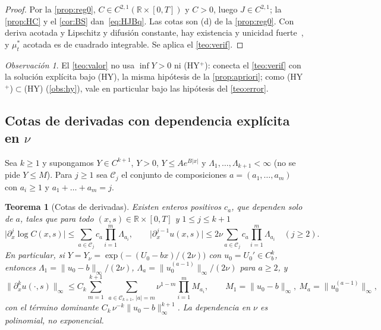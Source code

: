\documentclass[11pt,letterpaper]{article}
\theoremstyle{plain}
\newtheorem{teorema}[theorem]{Teorema}
\theoremstyle{definition}
\theoremstyle{remark}
\newtheorem{observacion}[theorem]{Observación}
\numberwithin{equation}{section}
\newcommand{\R}{\mathbb{R}}
\begin{document}
	\begin{proof}
		Por la \cref{prop:reg0}, \(C\in C^{2,1}(\R\times[0,T])\) y \(C>0\), luego \(J\in C^{2,1}\); la \cref{prop:HC} y el \cref{cor:BS} dan~\eqref{eq:HJBq}. Las cotas son (d) de la \cref{prop:reg0}. Con deriva acotada y Lipschitz y difusión constante, hay existencia y unicidad fuerte~\cite[Teor.~5.2.1]{Oksendal2003}, y \(\mu^\ast_t\) acotada es de cuadrado integrable. Se aplica el \cref{teo:verif}.
	\end{proof}
	
	\begin{observacion}
		El \cref{teo:valor} no usa \(\inf Y>0\) ni (HY\(^+\)): conecta el \cref{teo:verif} con la solución explícita bajo (HY), la misma hipótesis de la \cref{prop:apriori}; como (HY\(^+\))\(\subset\)(HY) (\cref{obs:hy}), vale en particular bajo las hipótesis del \cref{teo:error}.
	\end{observacion}
	
	\subsection{Cotas de derivadas con dependencia explícita en \texorpdfstring{\(\nu\)}{ν}}\label{subsec:cotasnu}
	
	Sea \(k\ge1\) y supongamos \(Y\in C^{k+1}\), \(Y>0\), \(Y\le Ae^{B|x|}\) y \(\Lambda_1,\dots,\Lambda_{k+1}<\infty\) (no se pide \(Y\le M\)). Para \(j\ge1\) sea \(\mathcal C_{j}\) el conjunto de composiciones \(a=(a_1,\dots,a_m)\) con \(a_i\ge1\) y \(a_1+\dots+a_m=j\).
	
	\begin{teorema}[Cotas de derivadas]\label{teo:cotasnu}
		Existen enteros positivos \(c_a\), que dependen solo de \(a\), tales que para todo \((x,s)\in\R\times[0,T]\) y \(1\le j\le k+1\)
		\[
		\bigl|\partial_x^j\log C(x,s)\bigr|\le\sum_{a\in\mathcal C_j}c_a\prod_{i=1}^{m}\Lambda_{a_i},
		\qquad
		\bigl|\partial_x^{j-1}u(x,s)\bigr|\le 2\nu\sum_{a\in\mathcal C_j}c_a\prod_{i=1}^{m}\Lambda_{a_i}\quad(j\ge2).
		\]
		En particular, si \(Y=Y_\nu=\exp\bigl(-(U_0-bx)/(2\nu)\bigr)\) con \(u_0=U_0'\in C_b^{k}\), entonces \(\Lambda_1=\|u_0-b\|_\infty/(2\nu)\), \(\Lambda_a=\|u_0^{(a-1)}\|_\infty/(2\nu)\) para \(a\ge2\), y
		\begin{equation}\label{eq:cotasnu}
			\|\partial_x^ku(\cdot,s)\|_\infty\le C_k\sum_{m=1}^{k+1}\ \sum_{a\in\mathcal C_{k+1},\,|a|=m}\nu^{1-m}\prod_{i=1}^{m}M_{a_i},\qquad M_1=\|u_0-b\|_\infty,\ M_a=\|u_0^{(a-1)}\|_\infty,
		\end{equation}
		con el término dominante \(C_k\,\nu^{-k}\|u_0-b\|_\infty^{k+1}\). La dependencia en \(\nu\) es polinomial, no exponencial.
	\end{teorema}
	
\end{document}
